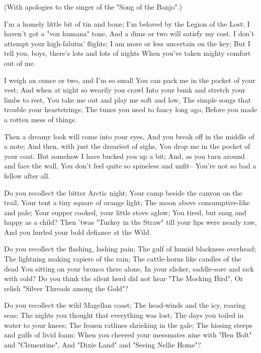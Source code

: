 
\begin{poemblock}
 (With apologies to the singer of the "Song of the Banjo".)


 I'm a homely little bit of tin and bone;
  I'm beloved by the Legion of the Lost;
 I haven't got a "vox humana" tone,
  And a dime or two will satisfy my cost.
 I don't attempt your high-falutin' flights;
  I am more or less uncertain on the key;
 But I tell you, boys, there's lots and lots of nights
  When you've taken mighty comfort out of me.

 I weigh an ounce or two, and I'm so small
  You can pack me in the pocket of your vest;
 And when at night so wearily you crawl
  Into your bunk and stretch your limbs to rest,
 You take me out and play me soft and low,
  The simple songs that trouble your heartstrings;
 The tunes you used to fancy long ago,
  Before you made a rotten mess of things.

 Then a dreamy look will come into your eyes,
  And you break off in the middle of a note;
 And then, with just the dreariest of sighs,
  You drop me in the pocket of your coat.
 But somehow I have bucked you up a bit;
  And, as you turn around and face the wall,
 You don't feel quite so spineless and unfit--
  You're not so bad a fellow after all.

 Do you recollect the bitter Arctic night;
  Your camp beside the canyon on the trail;
 Your tent a tiny square of orange light;
  The moon above consumptive-like and pale;
 Your supper cooked, your little stove aglow;
  You tired, but snug and happy as a child?
 Then 'twas "Turkey in the Straw" till your lips were nearly raw,
  And you hurled your bold defiance at the Wild.

 Do you recollect the flashing, lashing pain;
  The gulf of humid blackness overhead;
 The lightning making rapiers of the rain;
  The cattle-horns like candles of the dead
 You sitting on your bronco there alone,
  In your slicker, saddle-sore and sick with cold?
 Do you think the silent herd did not hear "The Mocking Bird",
  Or relish "Silver Threads among the Gold"?

 Do you recollect the wild Magellan coast;
  The head-winds and the icy, roaring seas;
 The nights you thought that everything was lost;
  The days you toiled in water to your knees;
 The frozen ratlines shrieking in the gale;
  The hissing steeps and gulfs of livid foam:
 When you cheered your messmates nine with "Ben Bolt" and "Clementine",
  And "Dixie Land" and "Seeing Nellie Home"?


\end{poemblock}
